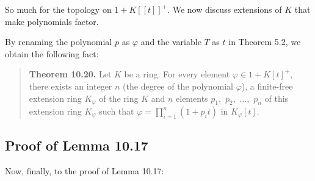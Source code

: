 \documentclass[numbers=enddot,12pt,final,onecolumn,notitlepage]{scrartcl}%
\begin{document}
So much for the topology on $1+K\left[  \left[  t\right]  \right]  ^{+}$. We
now discuss extensions of $K$ that make polynomials factor.

By renaming the polynomial $p$ as $\varphi$ and the variable $T$ as $t$ in
Theorem 5.2, we obtain the following fact:

\begin{quote}
\textbf{Theorem 10.20.} Let $K$ be a ring. For every element $\varphi
\in1+K\left[  t\right]  ^{+}$, there exists an integer $n$ (the degree of the
polynomial $\varphi$), a finite-free extension ring $K_{\varphi}$ of the ring
$K$ and $n$ elements $p_{1},$ $p_{2},$ $...,$ $p_{n}$ of this extension ring
$K_{\varphi}$ such that $\varphi=\prod\limits_{i=1}^{n}\left(  1+p_{i}%
t\right)  $ in $K_{\varphi}\left[  t\right]  $.
\end{quote}

\subsection{Proof of Lemma 10.17}

Now, finally, to the proof of Lemma 10.17:
\end{document}
